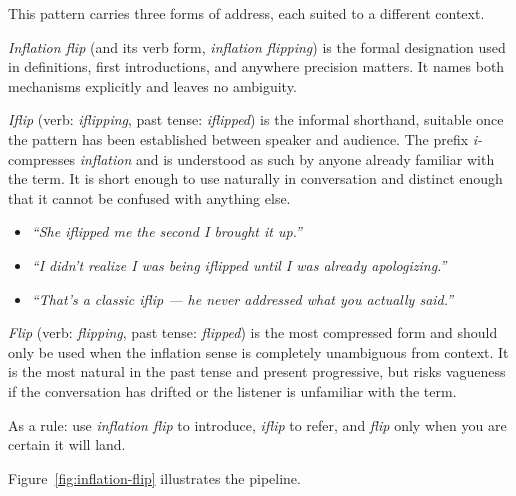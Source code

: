 \begin{remark}
This pattern carries three forms of address, each suited to a different context.

\emph{Inflation flip} (and its verb form, \emph{inflation flipping}) is the formal designation used in definitions, first introductions, and anywhere precision matters.
It names both mechanisms explicitly and leaves no ambiguity.

\emph{Iflip} (verb: \emph{iflipping}, past tense: \emph{iflipped}) is the informal shorthand, suitable once the pattern has been established between speaker and audience.
The prefix \emph{i-} compresses \emph{inflation} and is understood as such by anyone already familiar with the term.
It is short enough to use naturally in conversation and distinct enough that it cannot be confused with anything else.
\begin{itemize}
  \item \emph{``She iflipped me the second I brought it up.''}
  \item \emph{``I didn't realize I was being iflipped until I was already apologizing.''}
  \item \emph{``That's a classic iflip --- he never addressed what you actually said.''}
\end{itemize}

\emph{Flip} (verb: \emph{flipping}, past tense: \emph{flipped}) is the most compressed form and should only be used when the inflation sense is completely unambiguous from context.
It is the most natural in the past tense and present progressive, but risks vagueness if the conversation has drifted or the listener is unfamiliar with the term.

As a rule: use \emph{inflation flip} to introduce, \emph{iflip} to refer, and \emph{flip} only when you are certain it will land.
\end{remark}

Figure~\ref{fig:inflation-flip} illustrates the pipeline.

